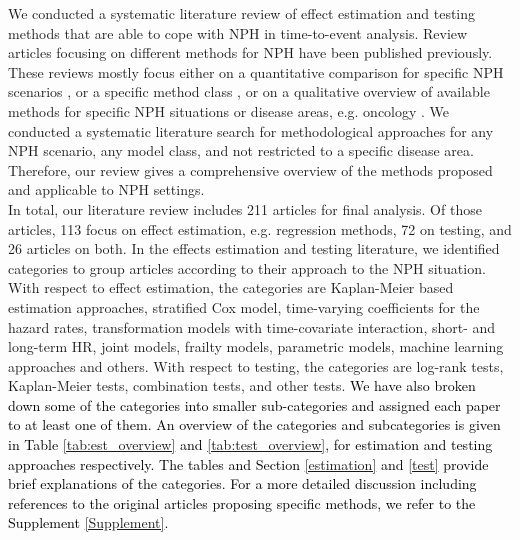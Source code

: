 \documentclass{article}
\newcommand{\NEW}[2][black]{\textcolor{#1}{#2}}
\begin{document}
We conducted a systematic literature review of effect estimation and testing methods that are able to cope with NPH in time-to-event analysis.
Review articles focusing on different methods for NPH have been published previously. These reviews mostly focus either on a quantitative comparison for specific NPH scenarios \cite{Li.2015}, or a specific method class \cite{Rauch.2018}, or on a qualitative overview of available methods for specific NPH situations or disease areas, e.g. oncology \cite{Ananthakrishnan.2021}. We conducted a systematic literature search for methodological approaches for any NPH scenario, any model class, and not restricted to a specific disease area. Therefore, our review gives a comprehensive overview of the methods proposed and applicable to NPH settings.
\\
\noindent
In total, our literature review includes 211 articles for final analysis.
Of those articles, 113 focus on effect estimation, e.g. regression methods, 72 on testing, and 26 articles on both.
In the effects estimation and testing literature, we identified categories to group articles according to their approach to the NPH situation.
With respect to effect estimation, the categories are Kaplan-Meier based estimation approaches, stratified Cox model, time-varying coefficients for the hazard rates, transformation models with time-covariate interaction, short- and long-term HR, joint models, frailty models, parametric models, machine learning approaches and others. 
With respect to testing, the categories are log-rank tests, Kaplan-Meier tests, combination tests, and other tests.
\NEW{We have also broken down some of the categories into smaller sub-categories and assigned each paper to at least one of them.
An overview of the categories and subcategories is given in Table \ref{tab:est_overview} and \ref{tab:test_overview}, for estimation and testing approaches respectively. The tables and Section \ref{estimation} and \ref{test} provide brief explanations of the categories. For a more detailed discussion including references to the original articles proposing specific methods, we refer to the Supplement \ref{Supplement}.}
\end{document}
